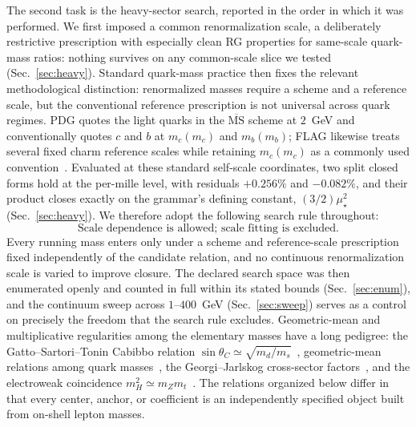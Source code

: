 \documentclass[aps,twocolumn,superscriptaddress,nofootinbib,floatfix]{revtex4-2}
\newcommand{\MSbar}{\overline{\mathrm{MS}}}
\newcommand{\mstar}{\mu_\star}
\begin{document}
The second task is the heavy-sector search, reported in the order in which it was performed. We first imposed a common renormalization scale, a deliberately restrictive prescription with especially clean RG properties for same-scale quark-mass ratios: nothing survives on any common-scale slice we tested (Sec.~\ref{sec:heavy}). Standard quark-mass practice then fixes the relevant methodological distinction: renormalized masses require a scheme and a reference scale, but the conventional reference prescription is not universal across quark regimes. PDG quotes the light quarks in the $\MSbar$ scheme at $2$~GeV and conventionally quotes $c$ and $b$ at $m_c(m_c)$ and $m_b(m_b)$; FLAG likewise treats several fixed charm reference scales while retaining $m_c(m_c)$ as a commonly used convention~\cite{PDG2026,FLAG2024}. Evaluated at these standard self-scale coordinates, two split closed forms hold at the per-mille level, with residuals $+0.256\%$ and $-0.082\%$, and their product closes exactly on the grammar's defining constant, $(3/2)\mstar^2$ (Sec.~\ref{sec:heavy}). We therefore adopt the following search rule throughout:
\begin{equation}
\boxed{\text{Scale dependence is allowed; scale fitting is excluded.}}
\label{eq:scalerule}
\end{equation}
Every running mass enters only under a scheme and reference-scale prescription fixed independently of the candidate relation, and no continuous renormalization scale is varied to improve closure. The declared search space was then enumerated openly and counted in full within its stated bounds (Sec.~\ref{sec:enum}), and the continuum sweep across $1$--$400$~GeV (Sec.~\ref{sec:sweep}) serves as a control on precisely the freedom that the search rule excludes. Geometric-mean and multiplicative regularities among the elementary masses have a long pedigree: the Gatto--Sartori--Tonin Cabibbo relation $\sin\theta_C\simeq\sqrt{m_d/m_s}$~\cite{GST1968,Fritzsch1978}, geometric-mean relations among quark masses~\cite{Ng1992,DSW1995}, the Georgi--Jarlskog cross-sector factors~\cite{GJ1979}, and the electroweak coincidence $m_H^2\simeq m_Z m_t$~\cite{TorrenteLujan2014}. The relations organized below differ in that every center, anchor, or coefficient is an independently specified object built from on-shell lepton masses.
\end{document}
